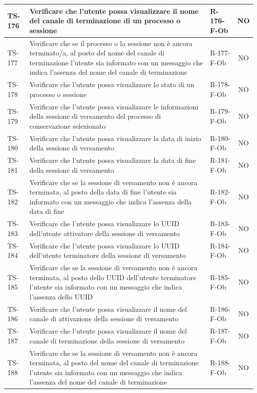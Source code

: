 \documentclass[a4paper,12pt]{article}
\begin{document}
\begin{longtable}{|p{1.5cm}|p{8.3cm}|p{2.4cm}|c|}
\hline
TS-176 & Verificare che l'utente possa visualizzare il nome del canale di terminazione di un processo o sessione & R-176-F-Ob & NO \\
\hline
TS-177 & Verificare che se il processo o la sessione non è ancora terminato/a, al posto del nome del canale di terminazione l'utente sia informato con un messaggio che indica l'assenza del nome del canale di terminazione & R-177-F-Ob & NO \\
\hline
TS-178 & Verificare che l'utente possa visualizzare lo stato di un processo o sessione & R-178-F-Ob & NO \\
\hline
TS-179 & Verificare che l'utente possa visualizzare le informazioni della sessione di versamento del processo di conservazione selezionato & R-179-F-Ob & NO \\
\hline
TS-180 & Verificare che l'utente possa visualizzare la data di inizio della sessione di versamento & R-180-F-Ob & NO \\
\hline
TS-181 & Verificare che l'utente possa visualizzare la data di fine della sessione di versamento & R-181-F-Ob & NO \\
\hline
TS-182 & Verificare che se la sessione di versamento non è ancora terminata, al posto della data di fine l'utente sia informato con un messaggio che indica l'assenza della data di fine & R-182-F-Ob & NO \\
\hline
TS-183 & Verificare che l'utente possa visualizzare lo UUID dell'utente attivatore della sessione di versamento & R-183-F-Ob & NO \\
\hline
TS-184 & Verificare che l'utente possa visualizzare lo UUID dell'utente terminatore della sessione di versamento & R-184-F-Ob & NO \\
\hline
TS-185 & Verificare che se la sessione di versamento non è ancora terminata, al posto dello UUID dell'utente terminatore l'utente sia informato con un messaggio che indica l'assenza dello UUID & R-185-F-Ob & NO \\
\hline
TS-186 & Verificare che l'utente possa visualizzare il nome del canale di attivazione della sessione di versamento & R-186-F-Ob & NO \\
\hline
TS-187 & Verificare che l'utente possa visualizzare il nome del canale di terminazione della sessione di versamento & R-187-F-Ob & NO \\
\hline
TS-188 & Verificare che se la sessione di versamento non è ancora terminata, al posto del nome del canale di terminazione l'utente sia informato con un messaggio che indica l'assenza del nome del canale di terminazione & R-188-F-Ob & NO \\

\end{longtable}
\end{document}
